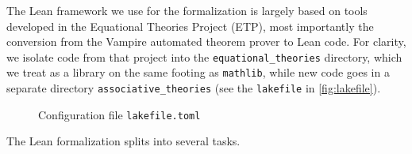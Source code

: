 \documentclass[12pt]{amsart}
\theoremstyle{plain}
\theoremstyle{definition}
\begin{document}
The Lean framework we use for the formalization is largely based on tools developed in the Equational Theories Project (ETP\@), most importantly the conversion from the Vampire automated theorem prover to Lean code.
For clarity, we isolate code from that project into the \texttt{equational\_theories} directory, which we treat as a library on the same footing as \texttt{mathlib}, while new code goes in a separate directory \texttt{associative\_theories} (see the \texttt{lakefile} in \autoref{fig:lakefile}).

\begin{figure}\centering
\fbox{}
\caption{\label{fig:lakefile}Configuration file \texttt{lakefile.toml}}
\end{figure}

The Lean formalization splits into several tasks.
\end{document}
